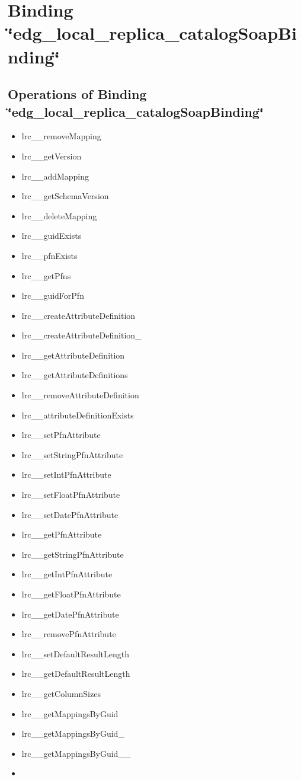 \section{Binding \char`\"{}edg\_\-local\_\-replica\_\-catalog\-Soap\-Binding\char`\"{}}\label{edg_local_replica_catalogSoapBinding}
\subsection{Operations of Binding  \char`\"{}edg\_\-local\_\-replica\_\-catalog\-Soap\-Binding\char`\"{}}\label{edg_local_replica_catalogSoapBinding_edg_local_replica_catalogSoapBinding_operations}
\begin{itemize}
\item lrc\_\-\_\-remove\-Mapping\item lrc\_\-\_\-get\-Version\item lrc\_\-\_\-add\-Mapping\item lrc\_\-\_\-get\-Schema\-Version\item lrc\_\-\_\-delete\-Mapping\item lrc\_\-\_\-guid\-Exists\item lrc\_\-\_\-pfn\-Exists\item lrc\_\-\_\-get\-Pfns\item lrc\_\-\_\-guid\-For\-Pfn\item lrc\_\-\_\-create\-Attribute\-Definition\item lrc\_\-\_\-create\-Attribute\-Definition\_\-\item lrc\_\-\_\-get\-Attribute\-Definition\item lrc\_\-\_\-get\-Attribute\-Definitions\item lrc\_\-\_\-remove\-Attribute\-Definition\item lrc\_\-\_\-attribute\-Definition\-Exists\item lrc\_\-\_\-set\-Pfn\-Attribute\item lrc\_\-\_\-set\-String\-Pfn\-Attribute\item lrc\_\-\_\-set\-Int\-Pfn\-Attribute\item lrc\_\-\_\-set\-Float\-Pfn\-Attribute\item lrc\_\-\_\-set\-Date\-Pfn\-Attribute\item lrc\_\-\_\-get\-Pfn\-Attribute\item lrc\_\-\_\-get\-String\-Pfn\-Attribute\item lrc\_\-\_\-get\-Int\-Pfn\-Attribute\item lrc\_\-\_\-get\-Float\-Pfn\-Attribute\item lrc\_\-\_\-get\-Date\-Pfn\-Attribute\item lrc\_\-\_\-remove\-Pfn\-Attribute\item lrc\_\-\_\-set\-Default\-Result\-Length\item lrc\_\-\_\-get\-Default\-Result\-Length\item lrc\_\-\_\-get\-Column\-Sizes\item lrc\_\-\_\-get\-Mappings\-By\-Guid\item lrc\_\-\_\-get\-Mappings\-By\-Guid\_\-\item lrc\_\-\_\-get\-Mappings\-By\-Guid\_\-\_\-\item 
\end{itemize}
